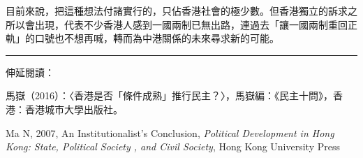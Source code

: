 目前來說，把這種想法付諸實行的，只佔香港社會的極少數。但香港獨立的訴求之所以會出現，代表不少香港人感到一國兩制已無出路，連過去「讓一國兩制重回正軌」的口號也不想再喊，轉而為中港關係的未來尋求新的可能。

\rule[-10pt]{15cm}{0.05em}

伸延閱讀：

馬嶽（2016）：〈香港是否「條件成熟」推行民主？〉，馬嶽編：《民主十問》，香港：香港城市大學出版社。

Ma N, 2007, An Institutionalist’s Conclusion, \textit{Political Development in Hong Kong: State, Political Society , and Civil Society}, Hong Kong University Press